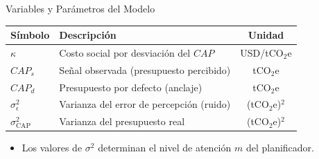 \documentclass[xcolor=dvipsnames]{beamer}
\begin{document}
\begin{frame}{Variables y Parámetros del Modelo}
    \vspace{0.3cm}
    \centering
    \footnotesize %
    \renewcommand{\arraystretch}{1.2} %
    
    \begin{tabular}{ll c} %
        \hline
        \textbf{Símbolo} & \textbf{Descripción} & \textbf{Unidad} \\ \hline
        $\kappa$ & Costo social por desviación del $CAP$ & USD/tCO$_2$e \\
        $CAP_s$ & Señal observada (presupuesto percibido) & tCO$_2$e \\
        $CAP_d$ & Presupuesto por defecto (anclaje) & tCO$_2$e \\
        $\sigma_\epsilon^2$ & Varianza del error de percepción (ruido) & (tCO$_2$e)$^2$ \\
        $\sigma_{\text{CAP}}^2$ & Varianza del presupuesto real & (tCO$_2$e)$^2$ \\ \hline
    \end{tabular}

    \vspace{0.6cm}
    \begin{itemize}
        \item \scriptsize Los valores de $\sigma^2$ determinan el nivel de atención $m$ del planificador.
    \end{itemize}
\end{frame}
\end{document}
